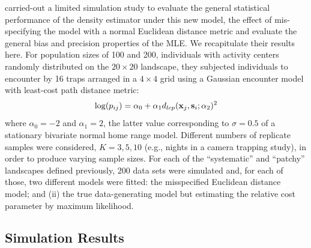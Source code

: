 \citet{royle_etal:2012ecol}
carried-out a limited simulation study to evaluate the
general statistical performance of the density estimator under
this new model, the effect of mis-specifying the model with a
normal Euclidean distance metric and evaluate the general bias and
precision properties of the MLE.
We recapitulate their results here.
For population sizes of 100 and 200, individuals with activity
centers randomly distributed on the $20 \times 20$ landscape, they
subjected individuals
to encounter by 16 traps arranged in a $4\times 4$ grid
using a Gaussian
encounter model with least-cost path distance metric:
\[
\log(p_{ij})= \alpha_{0} + \alpha_{1} d_{lcp}({\bf x}_{j},{\bf
  s}_{i}; \alpha_{2})^{2}
\]
where  $\alpha_{0} = -2$ and $\alpha_{1} = 2$, the latter value
corresponding to $\sigma = 0.5$ of a stationary bivariate normal home
range model.  Different numbers of replicate samples were considered,
$K=3,5,10$
(e.g., nights in a camera trapping study), in order
to produce varying sample
sizes.
For each of the ``systematic'' and ``patchy'' landscapes defined
previously, 200 data sets were simulated and, for each of those, two
different models were fitted: the misspecified Euclidean distance
model; and (ii) the true data-generating model but estimating the
relative cost parameter by maximum likelihood.

\subsection{Simulation Results}

